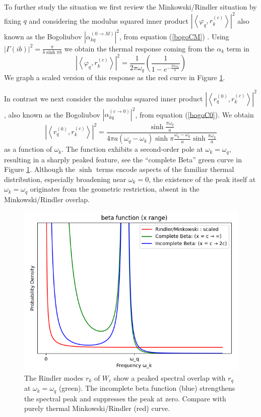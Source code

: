 \documentclass[12pt,a4paper]{article}
\begin{document}
{To further study the situation we first review the Minkowski/Rindler situation by fixing $q$ and considering the modulus squared inner product $\left|\left<\varphi_q, r_k^{(c)} \right>\right|^2$ also known as the Bogoliubov $\left|\alpha^{(0 \rightarrow M)}_{kq}\right|^2$, from equation (\ref{bogoCM}) . Using $|\Gamma(ib)|^2 = \frac{\pi}{b \sinh \pi b}$ we obtain the thermal response coming from the $\alpha_k$ term in
\begin{equation}
  \left|\left<\varphi_q, r_k^{(c)} \right>\right|^2 = \frac{1}{2\pi\omega_q} \left(\frac{1}{1 - e^{-\frac{2 \pi \omega_k}{a}}}\right)
\end{equation}
We graph a scaled version of this response as the red curve in Figure \ref{peaked}.

In contrast we next consider the modulus squared inner product $\left|\left<r_q^{(0)}, r_k^{(c)} \right>\right|^2$, also known as the Bogoliubov $\left|\alpha^{(c \rightarrow 0)}_{kq}\right|^2$, from equation (\ref{bogoC0}). We obtain
\begin{equation}
  \left|\left<r_q^{(0)}, r_k^{(c)} \right>\right|^2 = \frac{\sinh \frac{\pi \omega_q}{a}}{4\pi a (\omega_q - \omega_k) \sinh \pi \frac{\omega_q - \omega_k}{a} \sinh \frac{\pi \omega_k}{a}}
\end{equation}
as a function of $\omega_k$. The function exhibits a second-order pole at $\omega_k = \omega_q$, resulting in a sharply peaked feature, see the ``complete Beta'' green curve in Figure \ref{peaked}. Although the $\sinh$ terms encode aspects of the familiar thermal distribution, especially broadening near $\omega_k = 0$, the existence of the peak itself at $\omega_k = \omega_q$ originates from the geometric restriction, absent in the Minkowski/Rindler overlap.

\begin{figure}[h]
  \centering
\includegraphics[scale=0.6]{peaked.png}
\caption{The Rindler modes $r_k$ of $W_c$ show a peaked spectral overlap with $r_q$ at $\omega_k = \omega_q$ (green). The incomplete beta function (blue) strengthens the spectral peak and suppresses the peak at zero. Compare with purely thermal Minkowski/Rindler (red) curve.}
\label{peaked}
\end{figure}

}
\end{document}
